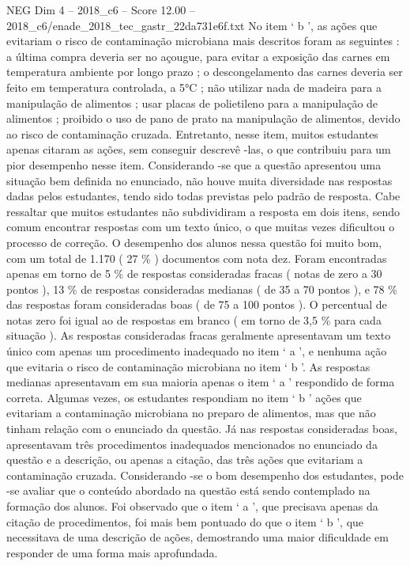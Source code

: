 \begin{textsample}{NEG Dim 4 – 2018\_c6 – Score 12.00 – 2018\_c6/enade\_2018\_tec\_gastr\_22da731e6f.txt}
No item ‘ b ’, as ações que evitariam o risco de contaminação microbiana mais descritos foram as seguintes : a última compra deveria ser no açougue, para evitar a exposição das carnes em temperatura ambiente por longo prazo ; o descongelamento das carnes deveria ser feito em temperatura controlada, a 5{\EmojiFont °}C ; não utilizar nada de madeira para a manipulação de alimentos ; usar placas de polietileno para a manipulação de alimentos ; proibido o uso de pano de prato na manipulação de alimentos, devido ao risco de contaminação cruzada.
Entretanto, nesse item, muitos estudantes apenas citaram as ações, sem conseguir descrevê -las, o que contribuiu para um pior desempenho nesse item.
Considerando -se que a questão apresentou uma situação bem definida no enunciado, não houve muita diversidade nas respostas dadas pelos estudantes, tendo sido todas previstas pelo padrão de resposta.
Cabe ressaltar que muitos estudantes não subdividiram a resposta em dois itens, sendo comum encontrar respostas com um texto único, o que muitas vezes dificultou o processo de correção.
O desempenho dos alunos nessa questão foi muito bom, com um total de 1.170 ( 27 \% ) documentos com nota dez.
Foram encontradas apenas em torno de 5 \% de respostas consideradas fracas ( notas de zero a 30 pontos ), 13 \% de respostas consideradas medianas ( de 35 a 70 pontos ), e 78 \% das respostas foram consideradas boas ( de 75 a 100 pontos ).
O percentual de notas zero foi igual ao de respostas em branco ( em torno de 3,5 \% para cada situação ).
As respostas consideradas fracas geralmente apresentavam um texto único com apenas um procedimento inadequado no item ‘ a ’, e nenhuma ação que evitaria o risco de contaminação microbiana no item ‘ b ’.
As respostas medianas apresentavam em sua maioria apenas o item ‘ a ’ respondido de forma correta.
Algumas vezes, os estudantes respondiam no item ‘ b ’ ações que evitariam a contaminação microbiana no preparo de alimentos, mas que não tinham relação com o enunciado da questão.
Já nas respostas consideradas boas, apresentavam três procedimentos inadequados mencionados no enunciado da questão e a descrição, ou apenas a citação, das três ações que evitariam a contaminação cruzada.
Considerando -se o bom desempenho dos estudantes, pode -se avaliar que o conteúdo abordado na questão está sendo contemplado na formação dos alunos.
Foi observado que o item ‘ a ’, que precisava apenas da citação de procedimentos, foi mais bem pontuado do que o item ‘ b ’, que necessitava de uma descrição de ações, demostrando uma maior dificuldade em responder de uma forma mais aprofundada.

\end{textsample}
